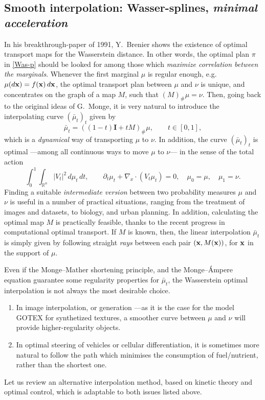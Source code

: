 \documentclass{article}
\def \Id{\mathbf{I}}
\def\bx{{\bf x}}
\begin{document}
\subsection{Smooth interpolation: Wasser-splines, \emph{minimal acceleration}}
In his breakthrough-paper of 1991, Y.~Brenier\cite{brenier1991polar} shows the existence of optimal transport maps for the Wasserstein distance. In other words, the optimal plan $\pi$ in \eqref{Was-p} should be looked for among those which \emph{maximize correlation between the marginals}. Whenever the first marginal $\mu$ is regular enough, e.g.~$\mu(d\bx) =f(\bx)\,d\bx$,  the optimal transport plan between $\mu$ and $\nu$ is unique, and concentrates on the graph of a map $M$, such that $(M)_\# \mu = \nu$. Then, going back to the original ideas of G.~Monge\cite{monge1781memoire}, it is very natural to introduce the interpolating curve $(\bar\mu_t)_t$ given by 
\begin{equation}\label{bb}
\bar\mu_t = ((1 - t) \Id + t M)_\# \mu, \qquad t \in [0,1],
\end{equation}
which is a \emph{dynamical} way of transporting $\mu$ to $\nu$. In addition, the curve $(\bar\mu_t)_t$ is optimal ---among all continuous ways to move $\mu$ to $\nu$--- in the sense of the total action\cite{Benamou} 
\[
\int_0^1 \int_{\mathbb R^n} |V_t|^2 \, d\mu_t \, dt, \qquad \partial_t \mu_t + \nabla_x \cdot (V_t \mu_t) = 0, \quad \mu_0=\mu, \quad \mu_1 = \nu. 
\]
Finding a suitable \emph{intermediate version} between two probability measures $\mu$ and $\nu$ is useful in a number of practical situations, ranging from the treatment of images and datasets, to biology, and  urban planning.\cite{peyre2019computational,santambrogio2015optimal} 
In addition, calculating the optimal map $M$ is practically feasible, thanks to the recent progress in computational optimal transport.\cite{peyre2019computational} If $M$ is known, then, the linear interpolation $\bar\mu_t$ is simply given by following straight \emph{rays} between each pair $(\bx,M(\bx))$, for $\bx$ in the support of $\mu$.

Even if the Monge--Mather shortening principle, and the Monge--Ámpere equation\cite{villani2009optimal} guarantee some regularity properties for $\bar\mu_t$, the Wasserstein optimal interpolation is not always the most desirable choice. 
\begin{enumerate}
    \item In image interpolation, or generation ---as it is the case for the model GOTEX for synthetized textures\cite{Houdard}, a smoother curve between $\mu$ and $\nu$ will provide higher-regularity objects.\cite{BenamouGallouet} 
    \item In optimal steering of vehicles or cellular differentiation, it is sometimes more natural to follow the path which minimises the consumption of fuel/nutrient, rather than the shortest one. 
\end{enumerate}
Let us review an alternative interpolation method, based on kinetic theory and optimal control\cite{Chen,Chewi,BrigatiOtikin,Einav,Elamvazhuthi,Justiniano}, which is adaptable to both issues listed above.
\end{document}
